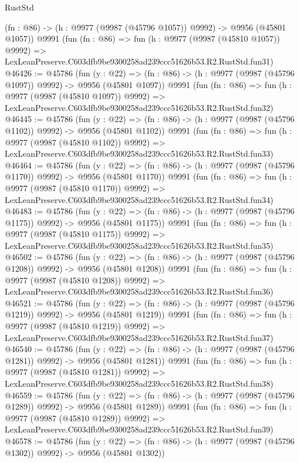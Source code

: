 \begin{lexlean}{RustStd}
\begin{coremodule}
    (fn : @86) -> (h : @9977 (@9987 (@45796 @1057)) @9992) -> @9956 (@45801 @1057))
    @9991
    (fun (fn : @86) =>
    fun (h : @9977 (@9987 (@45810 @1057)) @9992) =>
    LexLeanPreserve.C603dfb9be9300258ad239ccc51626b53.R2.RustStd.fun31)
@46426 := @45786
    (fun (y : @22) =>
    (fn : @86) -> (h : @9977 (@9987 (@45796 @1097)) @9992) -> @9956 (@45801 @1097))
    @9991
    (fun (fn : @86) =>
    fun (h : @9977 (@9987 (@45810 @1097)) @9992) =>
    LexLeanPreserve.C603dfb9be9300258ad239ccc51626b53.R2.RustStd.fun32)
@46445 := @45786
    (fun (y : @22) =>
    (fn : @86) -> (h : @9977 (@9987 (@45796 @1102)) @9992) -> @9956 (@45801 @1102))
    @9991
    (fun (fn : @86) =>
    fun (h : @9977 (@9987 (@45810 @1102)) @9992) =>
    LexLeanPreserve.C603dfb9be9300258ad239ccc51626b53.R2.RustStd.fun33)
@46464 := @45786
    (fun (y : @22) =>
    (fn : @86) -> (h : @9977 (@9987 (@45796 @1170)) @9992) -> @9956 (@45801 @1170))
    @9991
    (fun (fn : @86) =>
    fun (h : @9977 (@9987 (@45810 @1170)) @9992) =>
    LexLeanPreserve.C603dfb9be9300258ad239ccc51626b53.R2.RustStd.fun34)
@46483 := @45786
    (fun (y : @22) =>
    (fn : @86) -> (h : @9977 (@9987 (@45796 @1175)) @9992) -> @9956 (@45801 @1175))
    @9991
    (fun (fn : @86) =>
    fun (h : @9977 (@9987 (@45810 @1175)) @9992) =>
    LexLeanPreserve.C603dfb9be9300258ad239ccc51626b53.R2.RustStd.fun35)
@46502 := @45786
    (fun (y : @22) =>
    (fn : @86) -> (h : @9977 (@9987 (@45796 @1208)) @9992) -> @9956 (@45801 @1208))
    @9991
    (fun (fn : @86) =>
    fun (h : @9977 (@9987 (@45810 @1208)) @9992) =>
    LexLeanPreserve.C603dfb9be9300258ad239ccc51626b53.R2.RustStd.fun36)
@46521 := @45786
    (fun (y : @22) =>
    (fn : @86) -> (h : @9977 (@9987 (@45796 @1219)) @9992) -> @9956 (@45801 @1219))
    @9991
    (fun (fn : @86) =>
    fun (h : @9977 (@9987 (@45810 @1219)) @9992) =>
    LexLeanPreserve.C603dfb9be9300258ad239ccc51626b53.R2.RustStd.fun37)
@46540 := @45786
    (fun (y : @22) =>
    (fn : @86) -> (h : @9977 (@9987 (@45796 @1281)) @9992) -> @9956 (@45801 @1281))
    @9991
    (fun (fn : @86) =>
    fun (h : @9977 (@9987 (@45810 @1281)) @9992) =>
    LexLeanPreserve.C603dfb9be9300258ad239ccc51626b53.R2.RustStd.fun38)
@46559 := @45786
    (fun (y : @22) =>
    (fn : @86) -> (h : @9977 (@9987 (@45796 @1289)) @9992) -> @9956 (@45801 @1289))
    @9991
    (fun (fn : @86) =>
    fun (h : @9977 (@9987 (@45810 @1289)) @9992) =>
    LexLeanPreserve.C603dfb9be9300258ad239ccc51626b53.R2.RustStd.fun39)
@46578 := @45786
    (fun (y : @22) =>
    (fn : @86) -> (h : @9977 (@9987 (@45796 @1302)) @9992) -> @9956 (@45801 @1302))

\end{coremodule}
\end{lexlean}
